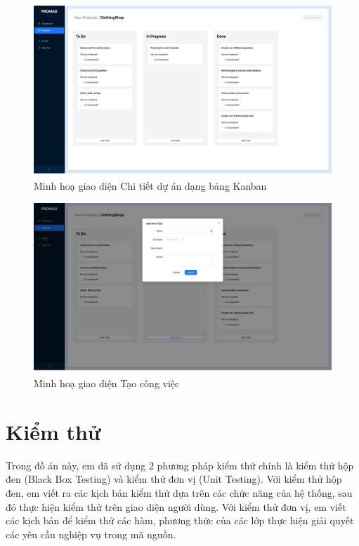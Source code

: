 \documentclass[../DoAn.tex]{subfiles}
\begin{document}
\newpage

\begin{figure}[H]
    \centering
    \includegraphics[width=1.0\linewidth]{Hinhve/Screenshot_KanbanBoard.png}
    \caption{Minh hoạ giao diện Chi tiết dự án dạng bảng Kanban}
    \label{fig:Screenshot_KanbanBoard}
\end{figure}

\begin{figure}[H]
    \centering
    \includegraphics[width=1.0\linewidth]{Hinhve/Screenshot_AddNewTask.png}
    \caption{Minh hoạ giao diện Tạo công việc}
    \label{fig:Screenshot_AddNewTask}
\end{figure}

\newpage

\section{Kiểm thử}
\label{section:4.4}

Trong đồ án này, em đã sử dụng 2 phương pháp kiểm thử chính là kiểm thử hộp đen (Black Box Testing) và kiểm thử đơn vị (Unit Testing). Với kiểm thử hộp đen,
em viết ra các kịch bản kiểm thử dựa trên các chức năng của hệ thống, sau đó thực hiện kiểm thử trên giao diện người dùng. Với kiểm thử đơn vị, em viết các
kịch bản để kiểm thử các hàm, phương thức của các lớp thực hiện giải quyết các yêu cầu nghiệp vụ trong mã nguồn.
\end{document}
